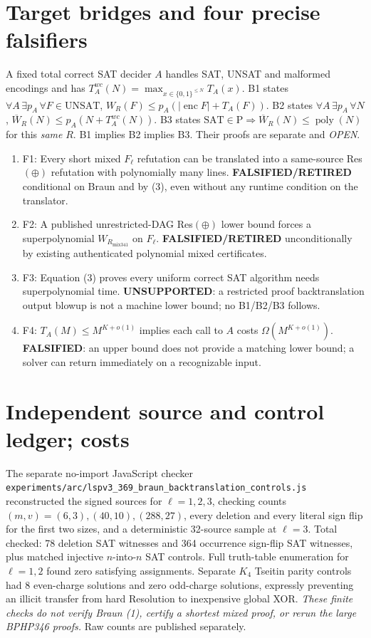 \documentclass[11pt]{article}
\begin{document}
\section*{Target bridges and four precise falsifiers}
A fixed total correct SAT decider $A$ handles SAT, UNSAT and malformed encodings and has
$T_A^{wc}(N)=\max_{x\in\{0,1\}^{\le N}}T_A(x)$.
B1 states $\forall A\,\exists p_A\,\forall F\in\mathrm{UNSAT}$,
$W_R(F)\le p_A(|\operatorname{enc}F|+T_A(F))$.
B2 states $\forall A\,\exists p_A\,\forall N$,
$\overline W_R(N)\le p_A(N+T_A^{wc}(N))$.
B3 states $\mathrm{SAT}\in\mathrm P\Longrightarrow\overline W_R(N)\le\operatorname{poly}(N)$ for this \emph{same} $R$.
B1 implies B2 implies B3. Their proofs are separate and \emph{OPEN}.
\begin{enumerate}
\item[] F1: Every short mixed $F_\ell$ refutation can be translated into a same-source Res$(\oplus)$ refutation with polynomially many lines. \textbf{FALSIFIED/RETIRED} conditional on Braun and by (3), even without any runtime condition on the translator.
\item[] F2: A published unrestricted-DAG Res$(\oplus)$ lower bound forces a superpolynomial $W_{R_{\mathrm{mix341}}}$ on $F_\ell$. \textbf{FALSIFIED/RETIRED} unconditionally by existing authenticated polynomial mixed certificates.
\item[] F3: Equation (3) proves every uniform correct SAT algorithm needs superpolynomial time. \textbf{UNSUPPORTED}: a restricted proof backtranslation output blowup is not a machine lower bound; no B1/B2/B3 follows.
\item[] F4: $T_A(M)\le M^{K+o(1)}$ implies each call to $A$ costs $\Omega(M^{K+o(1)})$. \textbf{FALSIFIED}: an upper bound does not provide a matching lower bound; a solver can return immediately on a recognizable input.
\end{enumerate}

\section*{Independent source and control ledger; costs}
The separate no-import JavaScript checker \texttt{experiments/arc/lspv3_369_braun_backtranslation_controls.js} reconstructed the signed sources for $\ell=1,2,3$, checking counts $(m,v)=(6,3),(40,10),(288,27)$, every deletion and every literal sign flip for the first two sizes, and a deterministic 32-source sample at $\ell=3$. Total checked: 78 deletion SAT witnesses and 364 occurrence sign-flip SAT witnesses, plus matched injective $n$-into-$n$ SAT controls. Full truth-table enumeration for $\ell=1,2$ found zero satisfying assignments. Separate $K_4$ Tseitin parity controls had 8 even-charge solutions and zero odd-charge solutions, expressly preventing an illicit transfer from hard Resolution to inexpensive global XOR. \emph{These finite checks do not verify Braun (1), certify a shortest mixed proof, or rerun the large BPHP346 proofs.} Raw counts are published separately.
\end{document}
